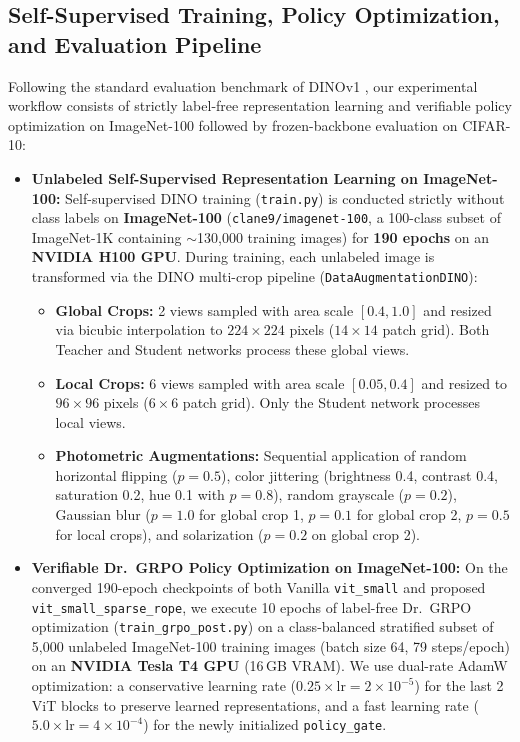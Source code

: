 \documentclass[11pt,a4paper]{article}
\begin{document}
\subsection{Self-Supervised Training, Policy Optimization, and Evaluation Pipeline}
\label{subsec:datasets}

Following the standard evaluation benchmark of DINOv1 \cite{caron2021emerging}, our experimental workflow consists of strictly label-free representation learning and verifiable policy optimization on ImageNet-100 followed by frozen-backbone evaluation on CIFAR-10:

\begin{itemize}[leftmargin=*]
    \item \textbf{Unlabeled Self-Supervised Representation Learning on ImageNet-100:} Self-supervised DINO training (\texttt{train.py}) is conducted strictly without class labels on \textbf{ImageNet-100} (\texttt{clane9/imagenet-100}, a 100-class subset of ImageNet-1K \cite{deng2009imagenet, tian2020contrastive} containing $\sim$130,000 training images) for \textbf{190 epochs} on an \textbf{NVIDIA H100 GPU}. During training, each unlabeled image is transformed via the DINO multi-crop pipeline (\texttt{DataAugmentationDINO}):
    \begin{itemize}
        \item \textbf{Global Crops:} 2 views sampled with area scale $[0.4, 1.0]$ and resized via bicubic interpolation to $224 \times 224$ pixels ($14 \times 14$ patch grid). Both Teacher and Student networks process these global views.
        \item \textbf{Local Crops:} 6 views sampled with area scale $[0.05, 0.4]$ and resized to $96 \times 96$ pixels ($6 \times 6$ patch grid). Only the Student network processes local views.
        \item \textbf{Photometric Augmentations:} Sequential application of random horizontal flipping ($p=0.5$), color jittering (brightness 0.4, contrast 0.4, saturation 0.2, hue 0.1 with $p=0.8$), random grayscale ($p=0.2$), Gaussian blur ($p=1.0$ for global crop 1, $p=0.1$ for global crop 2, $p=0.5$ for local crops), and solarization ($p=0.2$ on global crop 2).
    \end{itemize}

    \item \textbf{Verifiable Dr.\ GRPO Policy Optimization on ImageNet-100:} On the converged 190-epoch checkpoints of both Vanilla \texttt{vit\_small} and proposed \texttt{vit\_small\_sparse\_rope}, we execute 10 epochs of label-free Dr.\ GRPO optimization (\texttt{train\_grpo\_post.py}) on a class-balanced stratified subset of 5,000 unlabeled ImageNet-100 training images (batch size 64, 79 steps/epoch) on an \textbf{NVIDIA Tesla T4 GPU} (16\,GB VRAM). We use dual-rate AdamW optimization: a conservative learning rate ($0.25 \times \text{lr} = 2\times 10^{-5}$) for the last 2 ViT blocks to preserve learned representations, and a fast learning rate ($5.0 \times \text{lr} = 4\times 10^{-4}$) for the newly initialized \texttt{policy\_gate}.


\end{itemize}
\end{document}
